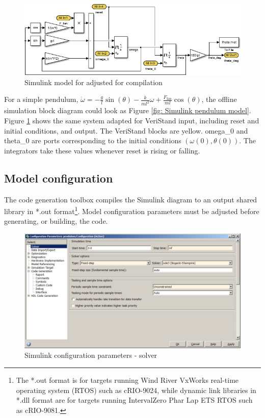 \documentclass[a4paper,twoside,english]{report}
\begin{document}
\begin{figure}[!h]
\centering \includegraphics[scale=0.45]{fig/simulink_after} \caption{Simulink model for adjusted for compilation}

\label{fig: simulink pendulum model for compilation} 
\end{figure}

For a simple pendulum, $\dot{\omega}=-\frac{g}{l}\sin\left(\theta\right)-\frac{k}{ml^{2}}\omega+\frac{F_{\text{fan}}}{ml}\cos\left(\theta\right)$,
the offline simulation block diagram could look as Figure \ref{fig: Simulink pendulum model}.
Figure \ref{fig: simulink pendulum model for compilation} shows the
same system adapted for VeriStand input, including reset and initial
conditions, and output. The VeriStand blocks are yellow. omega\_0
and theta\_0 are ports corresponding to the initial conditions $\left(\omega\left(0\right),\theta\left(0\right)\right)$.
The integrators take these values whenever reset is rising or falling.

\subsection{\label{subsec: Simulink model configuration}Model configuration}

The code generation toolbox compiles the Simulink diagram to an output
shared library in {*}.out format\footnote{The {*}.out format is for targets running Wind River VxWorks real-time
operating system (RTOS) such as cRIO-9024, while dynamic link libraries
in {*}.dll format are for targets running IntervalZero Phar Lap ETS
RTOS such as cRIO-9081.}. Model configuration parameters must be adjusted before generating,
or building, the code.

\begin{figure}[!h]
\centering \includegraphics[scale=0.45]{fig/simulink_settings_solver}
\caption{Simulink configuration parameters - solver}

\label{fig: simulink solver} 
\end{figure}
\end{document}
